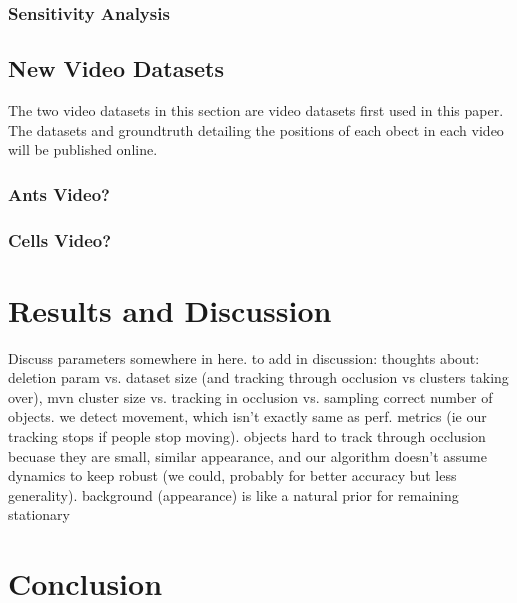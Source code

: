 \documentclass[smallcondensed, final]{svjour3}
\begin{document}
\subsubsection{Sensitivity Analysis}





\subsection{New Video Datasets}

The two video datasets in this section are video datasets first used in this paper. The datasets and groundtruth detailing the positions of each obect in each video will be published online.

\subsubsection{Ants Video?}

\subsubsection{Cells Video?}




\section*{Results and Discussion}

Discuss parameters somewhere in here. to add in discussion: thoughts about: deletion param vs. dataset size (and tracking through occlusion vs clusters taking over), mvn cluster size vs. tracking in occlusion vs. sampling correct number of objects.  we detect movement, which isn’t exactly same as perf. metrics (ie our tracking stops if people stop moving). objects hard to track through occlusion becuase they are small, similar appearance, and our algorithm doesn’t assume dynamics to keep robust (we could, probably for better accuracy but less generality). background (appearance) is like a natural prior for remaining stationary




\section*{Conclusion}















\begin{small}

 
\end{small}
\end{document}
